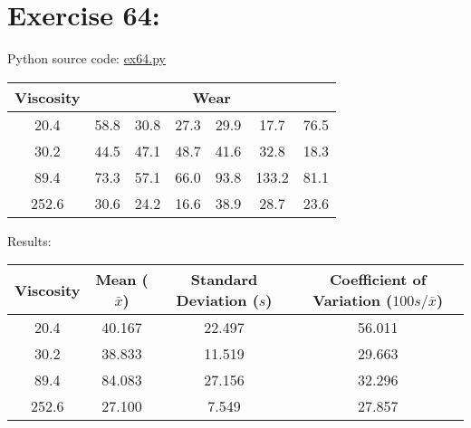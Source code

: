 \section{Exercise 64:}

Python source code: \href{run:./python-scripts/ex64.py}{ex64.py}

\begin{table}[h!]
    \centering
    \begin{tabular}{|c|c|c|c|c|c|c|} \hline
         \textbf{Viscosity} &  \multicolumn{6}{|c|}{\textbf{Wear}}\\ \hline
         20.4&  58.8&  30.8&  27.3&  29.9&  17.7& 76.5\\ \hline
         30.2&  44.5&  47.1&  48.7&  41.6&  32.8& 18.3\\ \hline
         89.4&  73.3&  57.1&  66.0&  93.8&  133.2& 81.1\\ \hline
         252.6&  30.6&  24.2&  16.6&  38.9&  28.7& 23.6\\ \hline
    \end{tabular}
\end{table}

Results:

\begin{table}[h!]
    \centering
    \begin{tabular}{|c|c|c|c|} \hline
        \textbf{Viscosity} & \textbf{Mean (\(\bar{x}\))} & \textbf{Standard Deviation (\(s\))} & \textbf{Coefficient of Variation (\(100s/\bar{x}\))} \\ \hline
        20.4  & 40.167 & 22.497 & 56.011 \\ \hline
        30.2  & 38.833 & 11.519 & 29.663  \\ \hline
        89.4  & 84.083 & 27.156 & 32.296  \\ \hline
        252.6 & 27.100 & 7.549  & 27.857  \\ \hline
    \end{tabular}
\end{table}


